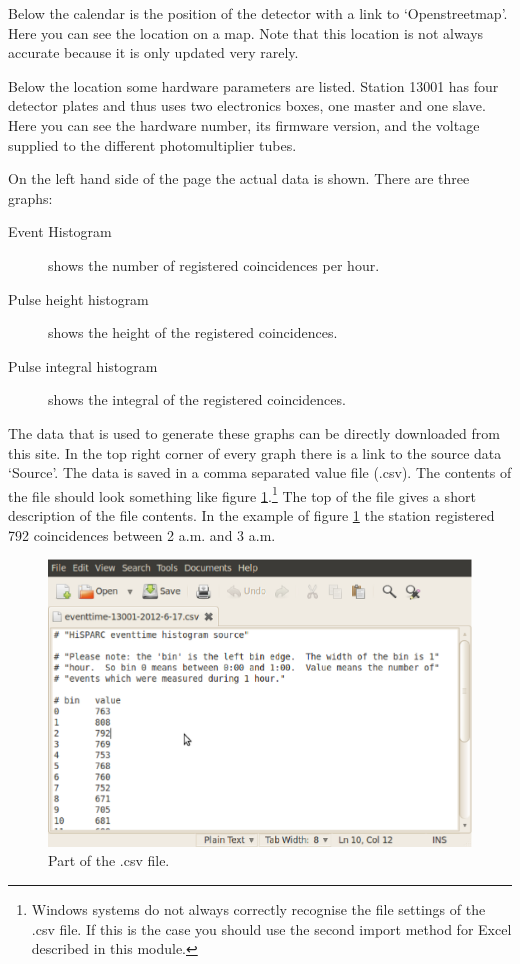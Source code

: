 \documentclass[12pt,a4paper]{article}
\numberwithin{equation}{section}
\numberwithin{figure}{section}
\numberwithin{table}{section}
\begin{document}
Below the calendar is the position of the detector with a link to `Openstreetmap'. Here you can see the location on a map. Note that this location is not always accurate because it is only updated very rarely.

Below the location some hardware parameters are listed. Station 13001 has four detector plates and thus uses two electronics boxes, one master and one slave. Here you can see the hardware number, its firmware version, and the voltage supplied to the different photomultiplier tubes.

On the left hand side of the page the actual data is shown. There are three graphs:
\begin{description}
\item[Event Histogram] shows the number of registered coincidences per hour.
\item[Pulse height histogram] shows the height of the registered coincidences.
\item[Pulse integral histogram] shows the integral of the registered coincidences.
\end{description}

The data that is used to generate these graphs can be directly downloaded from this site. In the top right corner of every graph there is a link to the source data `Source'. The data is saved in a comma separated value file (.csv). The contents of the file should look something like figure \ref{fig:data_CSV}.\footnote{Windows systems do not always correctly recognise the file settings of the .csv file. If this is the case you should use the second import method for Excel described in this module.} The top of the file gives a short description of the file contents. In the example of figure \ref{fig:data_CSV} the station registered 792 coincidences between 2 a.m. and 3 a.m.

\begin{figure}\begin{center}
\includegraphics[scale=0.5]{Screenshot_CSV_data_HiSPARC_Station_13001.eps}
\caption{Part of the .csv file.}\label{fig:data_CSV}
\end{center}\end{figure} 
\end{document}

